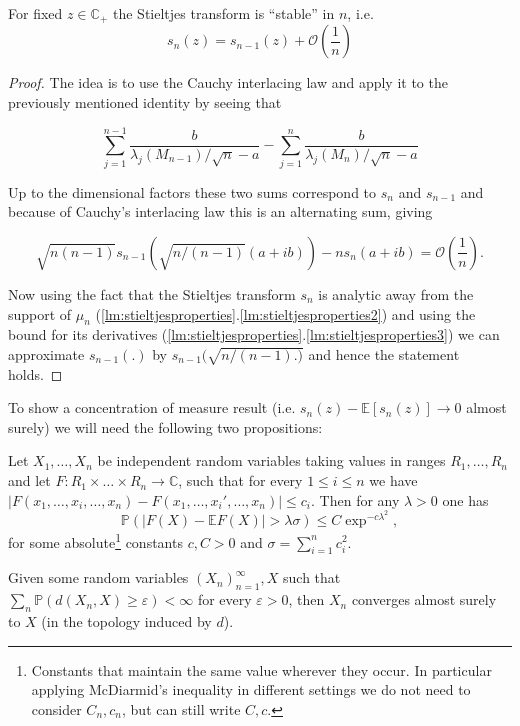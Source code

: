 \begin{lemma}
	For fixed $z\in\mathbb C_+$ the Stieltjes transform is ``stable'' in $n$, i.e.
	\begin{equation*}
		s_n(z)=s_{n-1}(z)+\mathcal O\left(\frac{1}{n}\right)
	\end{equation*}
\end{lemma}
\begin{proof}
	The idea is to use the Cauchy interlacing law and apply it to the previously mentioned identity by seeing that
	
	$$\sum_{j=1}^{n-1}\frac{b}{\lambda_j(M_{n-1})/\sqrt{n}-a}-\sum_{j=1}^n\frac{b}{\lambda_j(M_n)/\sqrt{n}-a}$$
	
	Up to the dimensional factors these two sums correspond to $s_n$ and $s_{n-1}$ and because of Cauchy's interlacing law this is an alternating sum, giving
	
	$$\sqrt{n(n-1)}s_{n-1}(\sqrt{n/(n-1)}(a+ib))-ns_n(a+ib)=\mathcal O\left(\frac{1}{n}\right).$$
	
	Now using the fact that the Stieltjes transform $s_n$ is analytic away from the support of $\mu_n$ (\ref{lm:stieltjesproperties}.\ref{lm:stieltjesproperties2}) and using the bound for its derivatives (\ref{lm:stieltjesproperties}.\ref{lm:stieltjesproperties3}) we can approximate $s_{n-1}(.)$ by $s_{n-1}(\sqrt{n/(n-1) . )}$ and hence the statement holds.
\end{proof}

To show a concentration of measure result (i.e. $s_n(z)-\mathbb E[s_n(z)]\rightarrow 0$ almost surely) we will need the following two propositions:

\begin{theorem}
	Let $X_1,\dots,X_n$ be independent random variables taking values in ranges $R_1,\dots,R_n$ and let $F:R_1\times\dots\times R_n\rightarrow\mathbb C$, such that for every $1\leq i\leq n$ we have $|F(x_1,\dots,x_i,\dots,x_n)-F(x_1,\dots,x_i',\dots,x_n)|\leq c_i$. Then for any $\lambda>0$ one has $$\mathbb P(|F(X)-\mathbb EF(X)|>\lambda\sigma)\leq C\exp^{-c\lambda^2},$$ for some absolute\footnote{Constants that maintain the same value wherever they occur. In particular applying McDiarmid's inequality in different settings we do not need to consider $C_n, c_n$, but can still write $C,c$.} constants $c,C>0$ and $\sigma=\sum_{i=1}^n c_i^2$.
\end{theorem}

\begin{lemma}
	Given some random variables $(X_n)_{n=1}^\infty,X$ such that $\sum_n \mathbb P(d(X_n,X)\geq\varepsilon)<\infty$ for every $\varepsilon>0$, then $X_n$ converges almost surely to $X$ (in the topology induced by $d$).
\end{lemma}

